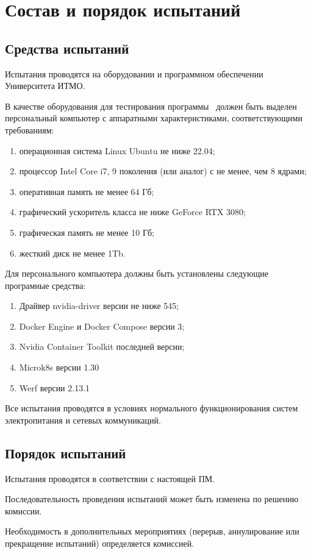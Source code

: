\newpage
\section{Состав и порядок испытаний}

\subsection{Средства испытаний}

Испытания проводятся на оборудовании и программном обеспечении Университета ИТМО.

В качестве оборудования для тестирования программы \productname \ должен быть выделен персональный компьютер с аппаратными характеристиками, соответствующими требованиям:
\begin{enumerate}
    \item операционная система Linux Ubuntu не ниже 22.04;
    \item процессор Intel Core i7, 9 поколения (или аналог) с не менее, чем 8 ядрами;
    \item оперативная память не менее 64 Гб;
    \item графический ускоритель класса не ниже GeForce RTX 3080;
    \item графическая память не менее 10 Гб;
    \item жесткий диск не менее 1Tb.
\end{enumerate}

Для персонального компьютера должны быть установлены следующие програмные средства:
\begin{enumerate}
    \item Драйвер nvidia-driver версии не ниже 545;
    \item Docker Engine и Docker Compose версии 3;
    \item Nvidia Container Toolkit последней версии;
    \item Microk8s версии 1.30
    \item Werf версии 2.13.1

\end{enumerate}

Все испытания проводятся в условиях нормального функционирования систем электропитания и сетевых коммуникаций.


\subsection{Порядок испытаний}

Испытания проводятся в соответствии с настоящей ПМ.

Последовательность проведения испытаний может быть изменена по решению комиссии.

Необходимость в дополнительных мероприятиях (перерыв, аннулирование или прекращение испытаний) определяется комиссией.